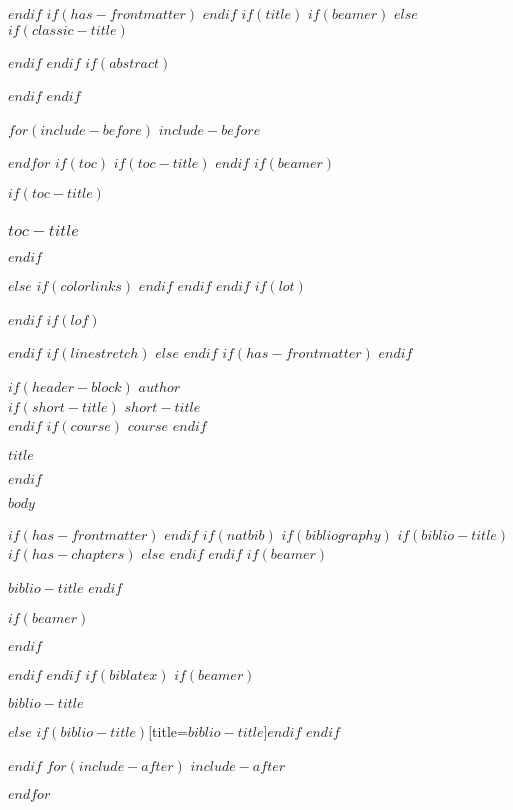 \documentclass[
  $if(fontsize)$
    $fontsize$,
  $endif$
  $if(lang)$
    $babel-lang$,
  $endif$
  $if(papersize)$
    $papersize$paper,
  $endif$
  $if(beamer)$
    ignorenonframetext,
    $if(handout)$
      handout,
    $endif$
    $if(aspectratio)$
      aspectratio=$aspectratio$,
    $endif$
  $endif$
  $for(classoption)$
    $classoption$$sep$,
  $endfor$
]{$documentclass$}
\newif\ifbibliography
\begin{document}
$endif$
$if(has-frontmatter)$
  \frontmatter
$endif$
$if(title)$
  $if(beamer)$
    \frame{\titlepage}
  $else$
    $if(classic-title)$
      \maketitle
    $endif$
  $endif$
  $if(abstract)$
  \begin{abstract}
    $abstract$
  \end{abstract}
  $endif$
$endif$

$for(include-before)$
  $include-before$

$endfor$
$if(toc)$
  $if(toc-title)$
    \renewcommand*\contentsname{$toc-title$}
  $endif$
  $if(beamer)$
  \begin{frame}
    $if(toc-title)$
      \frametitle{$toc-title$}
    $endif$
    \tableofcontents[hideallsubsections]
  \end{frame}
  $else$
    {
      $if(colorlinks)$
        \hypersetup{linkcolor=$if(toccolor)$$toccolor$$else$$endif$}
      $endif$
      \setcounter{tocdepth}{$toc-depth$}
      \tableofcontents
    }
  $endif$
$endif$
$if(lot)$
  \listoftables
$endif$
$if(lof)$
  \listoffigures
$endif$
$if(linestretch)$
$else$
$endif$
$if(has-frontmatter)$
  \mainmatter
$endif$

$if(header-block)$
  \noindent $author$\\
  $if(short-title)$
    \noindent $short-title$\\
  $endif$
  $if(course)$
    \noindent $course$
  $endif$

  \begin{center}
    \textbf{$title$}
  \end{center}
$endif$

$body$

$if(has-frontmatter)$
  \backmatter
$endif$
$if(natbib)$
  $if(bibliography)$
    $if(biblio-title)$
      $if(has-chapters)$
        \renewcommand\bibname{$biblio-title$}
      $else$
        \renewcommand\refname{$biblio-title$}
      $endif$
    $endif$
    $if(beamer)$
      \begin{frame}[allowframebreaks]{$biblio-title$}
        \bibliographytrue
    $endif$
    
    $if(beamer)$
      \end{frame}
    $endif$

  $endif$
$endif$
$if(biblatex)$
  $if(beamer)$
    \begin{frame}[allowframebreaks]{$biblio-title$}
      \bibliographytrue
      \printbibliography[heading=none]
    \end{frame}
  $else$
    \printbibliography$if(biblio-title)$[title=$biblio-title$]$endif$
  $endif$

$endif$
$for(include-after)$
  $include-after$

$endfor$
\end{document}

